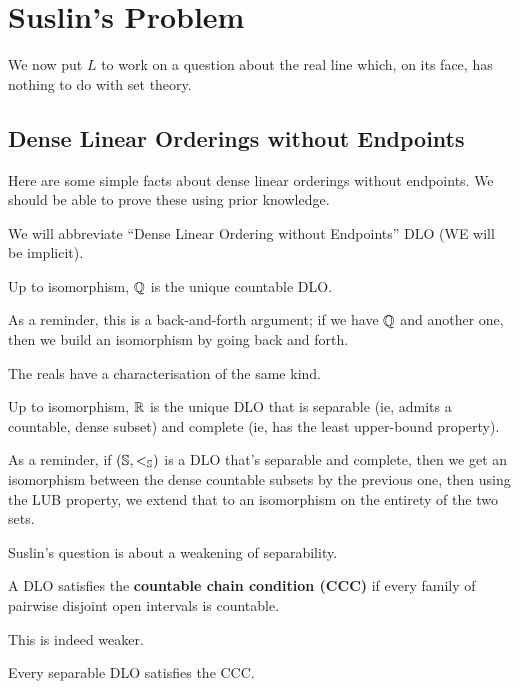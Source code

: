 \section{Suslin's Problem} \label{Ch5:Sec:Suslin}

We now put $L$ to work on a question about the real line which, on its face, has nothing to do with set theory.

\subsection{Dense Linear Orderings without Endpoints}

Here are some simple facts about dense linear orderings without endpoints. We should be able to prove these using prior knowledge.

We will abbreviate ``Dense Linear Ordering without Endpoints'' DLO (WE will be implicit).

\begin{boxlemma}
    Up to isomorphism, $\mathbb{Q}$ is the unique countable DLO.
\end{boxlemma}

As a reminder, this is a back-and-forth argument; if we have $\mathbb{Q}$ and another one, then we build an isomorphism by going back and forth.

The reals have a characterisation of the same kind.

\begin{boxlemma}
    Up to isomorphism, $\mathbb{R}$ is the unique DLO that is separable (ie, admits a countable, dense subset) and complete (ie, has the least upper-bound property).
\end{boxlemma}

As a reminder, if $\left( \mathbb{S}, <_{\mathbb{S}} \right)$ is a DLO that's separable and complete, then we get an isomorphism between the dense countable subsets by the previous one, then using the LUB property, we extend that to an isomorphism on the entirety of the two sets.

Suslin's question is about a weakening of separability.

\begin{boxdefinition}
    A DLO satisfies the \textbf{countable chain condition (CCC)} if every family of pairwise disjoint open intervals is countable.
\end{boxdefinition}

This is indeed weaker.

\begin{boxlemma}
    Every separable DLO satisfies the CCC.
\end{boxlemma}

